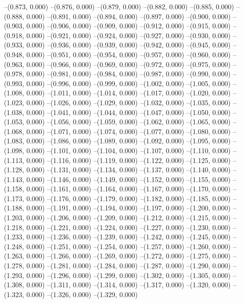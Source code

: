 --(0.873, 0.000)
--(0.876, 0.000)
--(0.879, 0.000)
--(0.882, 0.000)
--(0.885, 0.000)
--(0.888, 0.000)
--(0.891, 0.000)
--(0.894, 0.000)
--(0.897, 0.000)
--(0.900, 0.000)
--(0.903, 0.000)
--(0.906, 0.000)
--(0.909, 0.000)
--(0.912, 0.000)
--(0.915, 0.000)
--(0.918, 0.000)
--(0.921, 0.000)
--(0.924, 0.000)
--(0.927, 0.000)
--(0.930, 0.000)
--(0.933, 0.000)
--(0.936, 0.000)
--(0.939, 0.000)
--(0.942, 0.000)
--(0.945, 0.000)
--(0.948, 0.000)
--(0.951, 0.000)
--(0.954, 0.000)
--(0.957, 0.000)
--(0.960, 0.000)
--(0.963, 0.000)
--(0.966, 0.000)
--(0.969, 0.000)
--(0.972, 0.000)
--(0.975, 0.000)
--(0.978, 0.000)
--(0.981, 0.000)
--(0.984, 0.000)
--(0.987, 0.000)
--(0.990, 0.000)
--(0.993, 0.000)
--(0.996, 0.000)
--(0.999, 0.000)
--(1.002, 0.000)
--(1.005, 0.000)
--(1.008, 0.000)
--(1.011, 0.000)
--(1.014, 0.000)
--(1.017, 0.000)
--(1.020, 0.000)
--(1.023, 0.000)
--(1.026, 0.000)
--(1.029, 0.000)
--(1.032, 0.000)
--(1.035, 0.000)
--(1.038, 0.000)
--(1.041, 0.000)
--(1.044, 0.000)
--(1.047, 0.000)
--(1.050, 0.000)
--(1.053, 0.000)
--(1.056, 0.000)
--(1.059, 0.000)
--(1.062, 0.000)
--(1.065, 0.000)
--(1.068, 0.000)
--(1.071, 0.000)
--(1.074, 0.000)
--(1.077, 0.000)
--(1.080, 0.000)
--(1.083, 0.000)
--(1.086, 0.000)
--(1.089, 0.000)
--(1.092, 0.000)
--(1.095, 0.000)
--(1.098, 0.000)
--(1.101, 0.000)
--(1.104, 0.000)
--(1.107, 0.000)
--(1.110, 0.000)
--(1.113, 0.000)
--(1.116, 0.000)
--(1.119, 0.000)
--(1.122, 0.000)
--(1.125, 0.000)
--(1.128, 0.000)
--(1.131, 0.000)
--(1.134, 0.000)
--(1.137, 0.000)
--(1.140, 0.000)
--(1.143, 0.000)
--(1.146, 0.000)
--(1.149, 0.000)
--(1.152, 0.000)
--(1.155, 0.000)
--(1.158, 0.000)
--(1.161, 0.000)
--(1.164, 0.000)
--(1.167, 0.000)
--(1.170, 0.000)
--(1.173, 0.000)
--(1.176, 0.000)
--(1.179, 0.000)
--(1.182, 0.000)
--(1.185, 0.000)
--(1.188, 0.000)
--(1.191, 0.000)
--(1.194, 0.000)
--(1.197, 0.000)
--(1.200, 0.000)
--(1.203, 0.000)
--(1.206, 0.000)
--(1.209, 0.000)
--(1.212, 0.000)
--(1.215, 0.000)
--(1.218, 0.000)
--(1.221, 0.000)
--(1.224, 0.000)
--(1.227, 0.000)
--(1.230, 0.000)
--(1.233, 0.000)
--(1.236, 0.000)
--(1.239, 0.000)
--(1.242, 0.000)
--(1.245, 0.000)
--(1.248, 0.000)
--(1.251, 0.000)
--(1.254, 0.000)
--(1.257, 0.000)
--(1.260, 0.000)
--(1.263, 0.000)
--(1.266, 0.000)
--(1.269, 0.000)
--(1.272, 0.000)
--(1.275, 0.000)
--(1.278, 0.000)
--(1.281, 0.000)
--(1.284, 0.000)
--(1.287, 0.000)
--(1.290, 0.000)
--(1.293, 0.000)
--(1.296, 0.000)
--(1.299, 0.000)
--(1.302, 0.000)
--(1.305, 0.000)
--(1.308, 0.000)
--(1.311, 0.000)
--(1.314, 0.000)
--(1.317, 0.000)
--(1.320, 0.000)
--(1.323, 0.000)
--(1.326, 0.000)
--(1.329, 0.000)
